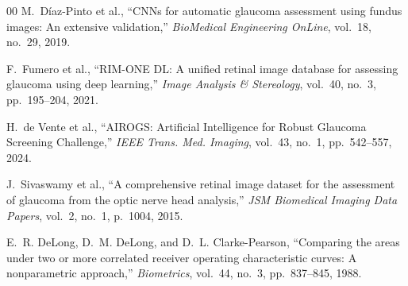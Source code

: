 \documentclass[conference]{IEEEtran}
\begin{document}
\begin{thebibliography}{00}
M.~Díaz-Pinto et al., ``CNNs for automatic glaucoma assessment
using fundus images: An extensive validation,''
\textit{BioMedical Engineering OnLine}, vol.~18, no.~29, 2019.
 
F.~Fumero et al., ``RIM-ONE DL: A unified retinal image database
for assessing glaucoma using deep learning,''
\textit{Image Analysis \& Stereology}, vol.~40, no.~3,
pp.~195--204, 2021.
 
H.~de Vente et al., ``AIROGS: Artificial Intelligence for Robust
Glaucoma Screening Challenge,'' \textit{IEEE Trans. Med. Imaging},
vol.~43, no.~1, pp.~542--557, 2024.
 
J.~Sivaswamy et al., ``A comprehensive retinal image dataset for
the assessment of glaucoma from the optic nerve head analysis,''
\textit{JSM Biomedical Imaging Data Papers}, vol.~2, no.~1,
p.~1004, 2015.
 
E.~R. DeLong, D.~M. DeLong, and D.~L. Clarke-Pearson, ``Comparing
the areas under two or more correlated receiver operating
characteristic curves: A nonparametric approach,''
\textit{Biometrics}, vol.~44, no.~3, pp.~837--845, 1988.
 
\end{thebibliography}
 
\end{document}

